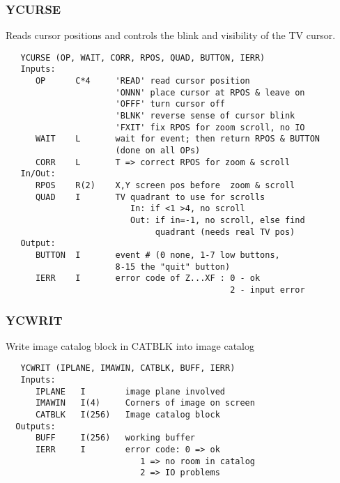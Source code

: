 \subsubsection{YCURSE}
Reads cursor positions and controls the blink and visibility
of the TV cursor.
\begin{verbatim}
   YCURSE (OP, WAIT, CORR, RPOS, QUAD, BUTTON, IERR)
   Inputs:
      OP      C*4     'READ' read cursor position
                      'ONNN' place cursor at RPOS & leave on
                      'OFFF' turn cursor off
                      'BLNK' reverse sense of cursor blink
                      'FXIT' fix RPOS for zoom scroll, no IO
      WAIT    L       wait for event; then return RPOS & BUTTON
                      (done on all OPs)
      CORR    L       T => correct RPOS for zoom & scroll
   In/Out:
      RPOS    R(2)    X,Y screen pos before  zoom & scroll
      QUAD    I       TV quadrant to use for scrolls
                         In: if <1 >4, no scroll
                         Out: if in=-1, no scroll, else find
                              quadrant (needs real TV pos)
   Output:
      BUTTON  I       event # (0 none, 1-7 low buttons,
                      8-15 the "quit" button)
      IERR    I       error code of Z...XF : 0 - ok
                                             2 - input error

\end{verbatim}

\subsubsection{YCWRIT}
Write image catalog block in CATBLK into image catalog
\begin{verbatim}
   YCWRIT (IPLANE, IMAWIN, CATBLK, BUFF, IERR)
   Inputs:
      IPLANE   I        image plane involved
      IMAWIN   I(4)     Corners of image on screen
      CATBLK   I(256)   Image catalog block
  Outputs:
      BUFF     I(256)   working buffer
      IERR     I        error code: 0 => ok
                           1 => no room in catalog
                           2 => IO problems

\end{verbatim}

